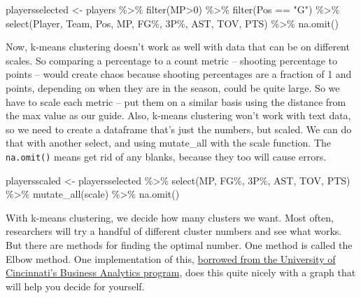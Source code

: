 \documentclass[
]{book}
\newenvironment{Shaded}{\begin{snugshade}}{\end{snugshade}}
\newcommand{\AttributeTok}[1]{\textcolor[rgb]{0.77,0.63,0.00}{#1}}
\newcommand{\DecValTok}[1]{\textcolor[rgb]{0.00,0.00,0.81}{#1}}
\newcommand{\FunctionTok}[1]{\textcolor[rgb]{0.00,0.00,0.00}{#1}}
\newcommand{\NormalTok}[1]{#1}
\newcommand{\OtherTok}[1]{\textcolor[rgb]{0.56,0.35,0.01}{#1}}
\newcommand{\SpecialCharTok}[1]{\textcolor[rgb]{0.00,0.00,0.00}{#1}}
\newcommand{\StringTok}[1]{\textcolor[rgb]{0.31,0.60,0.02}{#1}}
\begin{document}
\begin{Shaded}
\begin{Highlighting}[]
\NormalTok{playersselected }\OtherTok{\textless{}{-}}\NormalTok{ players }\SpecialCharTok{\%\textgreater{}\%} 
  \FunctionTok{filter}\NormalTok{(MP}\SpecialCharTok{\textgreater{}}\DecValTok{0}\NormalTok{) }\SpecialCharTok{\%\textgreater{}\%} \FunctionTok{filter}\NormalTok{(Pos }\SpecialCharTok{==} \StringTok{"G"}\NormalTok{) }\SpecialCharTok{\%\textgreater{}\%} 
  \FunctionTok{select}\NormalTok{(Player, Team, Pos, MP, }\StringTok{\textasciigrave{}}\AttributeTok{FG\%}\StringTok{\textasciigrave{}}\NormalTok{, }\StringTok{\textasciigrave{}}\AttributeTok{3P\%}\StringTok{\textasciigrave{}}\NormalTok{, AST, TOV, PTS) }\SpecialCharTok{\%\textgreater{}\%} 
  \FunctionTok{na.omit}\NormalTok{() }
\end{Highlighting}
\end{Shaded}

Now, k-means clustering doesn't work as well with data that can be on different scales. So comparing a percentage to a count metric -- shooting percentage to points -- would create chaos because shooting percentages are a fraction of 1 and points, depending on when they are in the season, could be quite large. So we have to scale each metric -- put them on a similar basis using the distance from the max value as our guide. Also, k-means clustering won't work with text data, so we need to create a dataframe that's just the numbers, but scaled. We can do that with another select, and using mutate\_all with the scale function. The \texttt{na.omit()} means get rid of any blanks, because they too will cause errors.

\begin{Shaded}
\begin{Highlighting}[]
\NormalTok{playersscaled }\OtherTok{\textless{}{-}}\NormalTok{ playersselected }\SpecialCharTok{\%\textgreater{}\%} 
  \FunctionTok{select}\NormalTok{(MP, }\StringTok{\textasciigrave{}}\AttributeTok{FG\%}\StringTok{\textasciigrave{}}\NormalTok{, }\StringTok{\textasciigrave{}}\AttributeTok{3P\%}\StringTok{\textasciigrave{}}\NormalTok{, AST, TOV, PTS) }\SpecialCharTok{\%\textgreater{}\%} 
  \FunctionTok{mutate\_all}\NormalTok{(scale) }\SpecialCharTok{\%\textgreater{}\%} 
  \FunctionTok{na.omit}\NormalTok{()}
\end{Highlighting}
\end{Shaded}

With k-means clustering, we decide how many clusters we want. Most often, researchers will try a handful of different cluster numbers and see what works. But there are methods for finding the optimal number. One method is called the Elbow method. One implementation of this, \href{https://uc-r.github.io/kmeans_clustering}{borrowed from the University of Cincinnati's Business Analytics program}, does this quite nicely with a graph that will help you decide for yourself.
\end{document}
